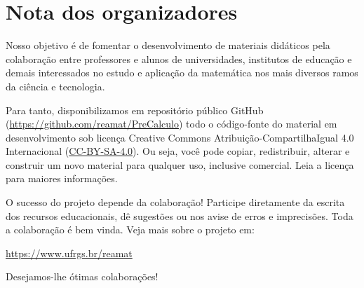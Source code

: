 
\chapter*{Nota dos organizadores}

Nosso objetivo é de fomentar o desenvolvimento de materiais didáticos pela colaboração entre professores e alunos de universidades, institutos de educação e demais interessados no estudo e aplicação da matemática nos mais diversos ramos da ciência e tecnologia.

Para tanto, disponibilizamos em repositório público GitHub (\url{https://github.com/reamat/PreCalculo}) todo o código-fonte do material em desenvolvimento sob licença Creative Commons Atribuição-CompartilhaIgual 4.0 Internacional (\href{https://creativecommons.org/licenses/by-sa/4.0/}{CC-BY-SA-4.0}). Ou seja, você pode copiar, redistribuir, alterar e construir um novo material para qualquer uso, inclusive comercial. Leia a licença para maiores informações.

O sucesso do projeto depende da colaboração! Participe diretamente da escrita dos recursos educacionais, dê sugestões ou nos avise de erros e imprecisões. Toda a colaboração é bem vinda. Veja mais sobre o projeto em:
\begin{center}
  \url{https://www.ufrgs.br/reamat}
\end{center}

\vspace{0.5cm}

Desejamos-lhe ótimas colaborações!
